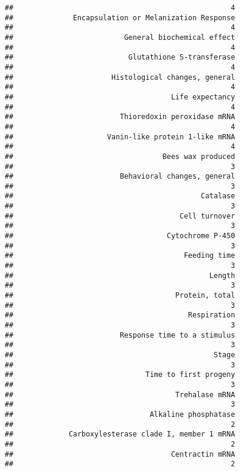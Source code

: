 \documentclass[]{article}
\begin{document}
\begin{verbatim}
##                                                   4 
##              Encapsulation or Melanization Response 
##                                                   4 
##                          General biochemical effect 
##                                                   4 
##                           Glutathione S-transferase 
##                                                   4 
##                       Histological changes, general 
##                                                   4 
##                                     Life expectancy 
##                                                   4 
##                         Thioredoxin peroxidase mRNA 
##                                                   4 
##                      Vanin-like protein 1-like mRNA 
##                                                   4 
##                                   Bees wax produced 
##                                                   3 
##                         Behavioral changes, general 
##                                                   3 
##                                            Catalase 
##                                                   3 
##                                       Cell turnover 
##                                                   3 
##                                    Cytochrome P-450 
##                                                   3 
##                                        Feeding time 
##                                                   3 
##                                              Length 
##                                                   3 
##                                      Protein, total 
##                                                   3 
##                                         Respiration 
##                                                   3 
##                         Response time to a stimulus 
##                                                   3 
##                                               Stage 
##                                                   3 
##                               Time to first progeny 
##                                                   3 
##                                      Trehalase mRNA 
##                                                   3 
##                                Alkaline phosphatase 
##                                                   2 
##             Carboxylesterase clade I, member 1 mRNA 
##                                                   2 
##                                     Centractin mRNA 
##                                                   2 

\end{verbatim}
\end{document}
